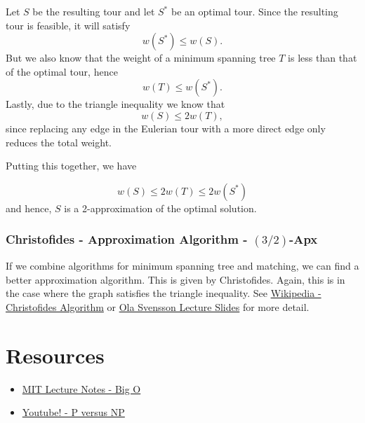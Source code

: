 Let $S$ be the resulting tour and let $S^*$ be an optimal tour.
Since the resulting tour is feasible, it will satisfy 
\[
w(S^*) \leq w(S).
\]
But we also know that the weight of a minimum spanning tree $T$ is less than that of the optimal tour, hence
\[
w(T) \leq w(S^*).
\]
Lastly, due to the triangle inequality we know that 
\[
w(S) \leq 2 w(T),
\]
since replacing any edge in the Eulerian tour with a more direct edge only reduces the total weight.

Putting this together, we have

\[w(S) \leq 2w(T) \leq 2 w(S^*)\]
and hence, $S$ is a 2-approximation of the optimal solution.

\subsubsection{Christofides - Approximation Algorithm - $(3/2)$-Apx}
If we combine algorithms for minimum spanning tree and matching, we can find a better approximation algorithm.  This is given by Christofides.  Again, this is in the case where the graph satisfies the triangle inequality.  See 
\href{https://en.wikipedia.org/wiki/Christofides_algorithm}{Wikipedia - Christofides Algorithm} or \href{https://resources.mpi-inf.mpg.de/conferences/adfocs-15/material/Ola-Lect1.pdf}{Ola Svensson Lecture Slides} for more detail.

\section{Resources}
\begin{resource}
\begin{itemize}
\item \href{http://web.mit.edu/16.070/www/lecture/big_o.pdf}{MIT Lecture Notes - Big O}
\item \href{https://www.youtube.com/watch?v=YX40hbAHx3s}{Youtube! - P versus NP}
\end{itemize}
\end{resource}

